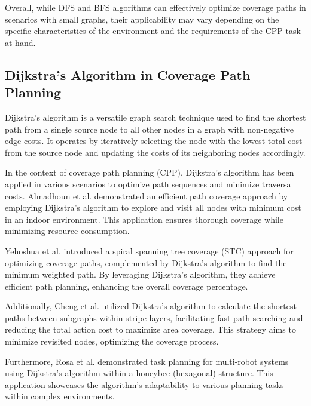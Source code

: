\vspace*{6mm}

Overall, while DFS and BFS algorithms can effectively optimize coverage paths in scenarios with small graphs, their applicability may vary depending on the specific characteristics of the environment and the requirements of the CPP task at hand.


\subsection{Dijkstra's Algorithm in Coverage Path Planning}

Dijkstra's algorithm is a versatile graph search technique used to find the shortest path from a single source node to all other nodes in a graph with non-negative edge costs. It operates by iteratively selecting the node with the lowest total cost from the source node and updating the costs of its neighboring nodes accordingly.

\vspace*{6mm}

In the context of coverage path planning (CPP), Dijkstra's algorithm has been applied in various scenarios to optimize path sequences and minimize traversal costs. Almadhoun et al. demonstrated an efficient path coverage approach by employing Dijkstra's algorithm to explore and visit all nodes with minimum cost in an indoor environment. This application ensures thorough coverage while minimizing resource consumption.

\vspace*{6mm}

Yehoshua et al. introduced a spiral spanning tree coverage (STC) approach for optimizing coverage paths, complemented by Dijkstra's algorithm to find the minimum weighted path. By leveraging Dijkstra's algorithm, they achieve efficient path planning, enhancing the overall coverage percentage.

\vspace*{6mm}

Additionally, Cheng et al. utilized Dijkstra's algorithm to calculate the shortest paths between subgraphs within stripe layers, facilitating fast path searching and reducing the total action cost to maximize area coverage. This strategy aims to minimize revisited nodes, optimizing the coverage process.

\vspace*{6mm}

Furthermore, Rosa et al. demonstrated task planning for multi-robot systems using Dijkstra's algorithm within a honeybee (hexagonal) structure. This application showcases the algorithm's adaptability to various planning tasks within complex environments.

